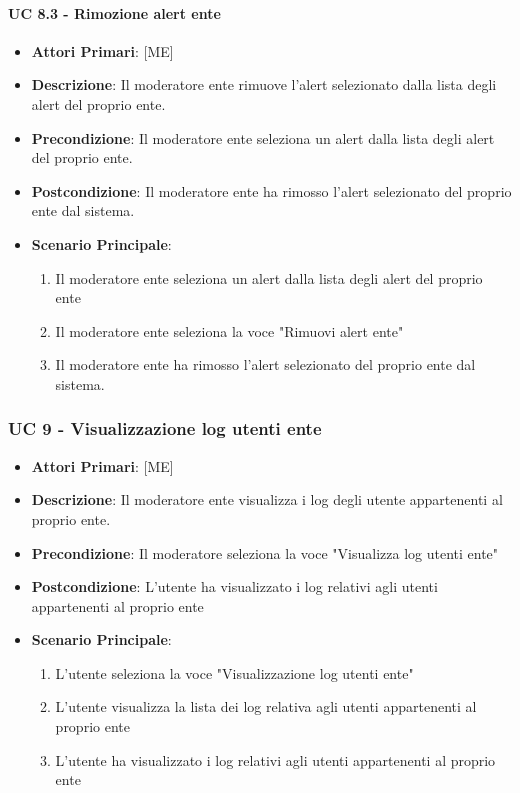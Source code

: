 			\paragraph{UC 8.3 - Rimozione alert ente}
			\begin{itemize}
				\item \textbf{Attori Primari}: [ME]
				\item \textbf{Descrizione}: Il moderatore ente rimuove l'alert selezionato dalla lista degli alert del proprio ente.
				\item \textbf{Precondizione}: Il moderatore ente seleziona un alert dalla lista degli alert del proprio ente.
				\item \textbf{Postcondizione}: Il moderatore ente ha rimosso l'alert selezionato del proprio ente dal sistema.
				\item \textbf{Scenario Principale}:
				\begin{enumerate}
					\item{Il moderatore ente seleziona un alert dalla lista degli alert del proprio ente}
					\item{Il moderatore ente seleziona la voce "Rimuovi alert ente"}
					\item{Il moderatore ente ha rimosso l'alert selezionato del proprio ente dal sistema.}
				\end{enumerate}	
			\end{itemize}

		\subsubsection{UC 9 - Visualizzazione log utenti ente}
		\begin{itemize}
			\item \textbf{Attori Primari}: [ME]
			\item \textbf{Descrizione}: Il moderatore ente visualizza i log degli utente appartenenti al proprio ente.
			\item \textbf{Precondizione}: Il moderatore seleziona la voce "Visualizza log utenti ente"
			\item \textbf{Postcondizione}: L'utente ha visualizzato i log relativi agli utenti appartenenti al proprio ente
			\item \textbf{Scenario Principale}:
			\begin{enumerate}
				\item{L'utente seleziona la voce "Visualizzazione log utenti ente"}
				\item{L'utente visualizza la lista dei log relativa agli utenti appartenenti al proprio ente}
				\item{L'utente ha visualizzato i log relativi agli utenti appartenenti al proprio ente}
			\end{enumerate}	
		\end{itemize}

